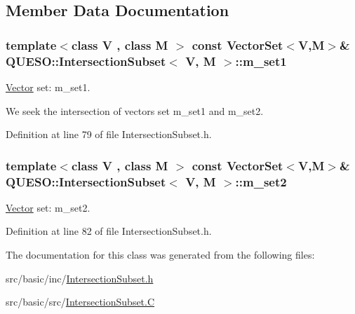 \subsection{Member Data Documentation}
\hypertarget{class_q_u_e_s_o_1_1_intersection_subset_a0b7b665d6b283d3cfe154f4b52f2b7f6}{
\subsubsection[{m\-\_\-set1}]{\setlength{\rightskip}{0pt plus 5cm}template$<$class V , class M $>$ const {\bf Vector\-Set}$<$V,M$>$\& {\bf Q\-U\-E\-S\-O\-::\-Intersection\-Subset}$<$ V, M $>$\-::m\-\_\-set1\hspace{0.3cm}{\ttfamily [protected]}}}\label{class_q_u_e_s_o_1_1_intersection_subset_a0b7b665d6b283d3cfe154f4b52f2b7f6}


\hyperlink{class_q_u_e_s_o_1_1_vector}{Vector} set\-: m\-\_\-set1. 

We seek the intersection of vectors set m\-\_\-set1 and m\-\_\-set2. 

Definition at line 79 of file Intersection\-Subset.\-h.

\hypertarget{class_q_u_e_s_o_1_1_intersection_subset_adb82477167bf58ce2a9fb79e0bbccb96}{
\subsubsection[{m\-\_\-set2}]{\setlength{\rightskip}{0pt plus 5cm}template$<$class V , class M $>$ const {\bf Vector\-Set}$<$V,M$>$\& {\bf Q\-U\-E\-S\-O\-::\-Intersection\-Subset}$<$ V, M $>$\-::m\-\_\-set2\hspace{0.3cm}{\ttfamily [protected]}}}\label{class_q_u_e_s_o_1_1_intersection_subset_adb82477167bf58ce2a9fb79e0bbccb96}


\hyperlink{class_q_u_e_s_o_1_1_vector}{Vector} set\-: m\-\_\-set2. 



Definition at line 82 of file Intersection\-Subset.\-h.



The documentation for this class was generated from the following files\-:\begin{DoxyCompactItemize}
\item 
src/basic/inc/\hyperlink{_intersection_subset_8h}{Intersection\-Subset.\-h}\item 
src/basic/src/\hyperlink{_intersection_subset_8_c}{Intersection\-Subset.\-C}\end{DoxyCompactItemize}
